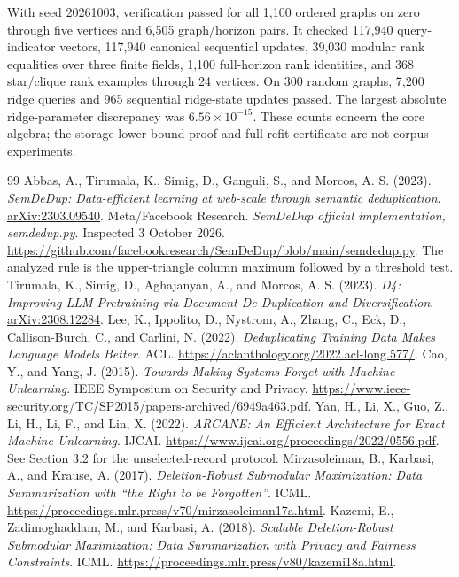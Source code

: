 \documentclass[11pt,a4paper]{article}
\theoremstyle{definition}\newtheorem{definition}[theorem]{Definition}
\begin{document}
With seed 20261003, verification passed for all 1,100 ordered graphs on zero through five vertices and 6,505 graph/horizon pairs. It checked 117,940 query-indicator vectors, 117,940 canonical sequential updates, 39,030 modular rank equalities over three finite fields, 1,100 full-horizon rank identities, and 368 star/clique rank examples through 24 vertices. On 300 random graphs, 7,200 ridge queries and 965 sequential ridge-state updates passed. The largest absolute ridge-parameter discrepancy was $6.56\times10^{-15}$. These counts concern the core algebra; the storage lower-bound proof and full-refit certificate are not corpus experiments.

\begin{thebibliography}{99}\small
{} Abbas, A., Tirumala, K., Simig, D., Ganguli, S., and Morcos, A. S. (2023). \emph{SemDeDup: Data-efficient learning at web-scale through semantic deduplication}. \href{https://arxiv.org/abs/2303.09540}{arXiv:2303.09540}.
 Meta/Facebook Research. \emph{SemDeDup official implementation, semdedup.py}. Inspected 3 October 2026. \url{https://github.com/facebookresearch/SemDeDup/blob/main/semdedup.py}. The analyzed rule is the upper-triangle column maximum followed by a threshold test.
 Tirumala, K., Simig, D., Aghajanyan, A., and Morcos, A. S. (2023). \emph{D4: Improving LLM Pretraining via Document De-Duplication and Diversification}. \href{https://arxiv.org/abs/2308.12284}{arXiv:2308.12284}.
 Lee, K., Ippolito, D., Nystrom, A., Zhang, C., Eck, D., Callison-Burch, C., and Carlini, N. (2022). \emph{Deduplicating Training Data Makes Language Models Better}. ACL. \url{https://aclanthology.org/2022.acl-long.577/}.
 Cao, Y., and Yang, J. (2015). \emph{Towards Making Systems Forget with Machine Unlearning}. IEEE Symposium on Security and Privacy. \url{https://www.ieee-security.org/TC/SP2015/papers-archived/6949a463.pdf}.
 Yan, H., Li, X., Guo, Z., Li, H., Li, F., and Lin, X. (2022). \emph{ARCANE: An Efficient Architecture for Exact Machine Unlearning}. IJCAI. \url{https://www.ijcai.org/proceedings/2022/0556.pdf}. See Section 3.2 for the unselected-record protocol.
 Mirzasoleiman, B., Karbasi, A., and Krause, A. (2017). \emph{Deletion-Robust Submodular Maximization: Data Summarization with ``the Right to be Forgotten''}. ICML. \url{https://proceedings.mlr.press/v70/mirzasoleiman17a.html}.
 Kazemi, E., Zadimoghaddam, M., and Karbasi, A. (2018). \emph{Scalable Deletion-Robust Submodular Maximization: Data Summarization with Privacy and Fairness Constraints}. ICML. \url{https://proceedings.mlr.press/v80/kazemi18a.html}.

\end{thebibliography}
\end{document}
